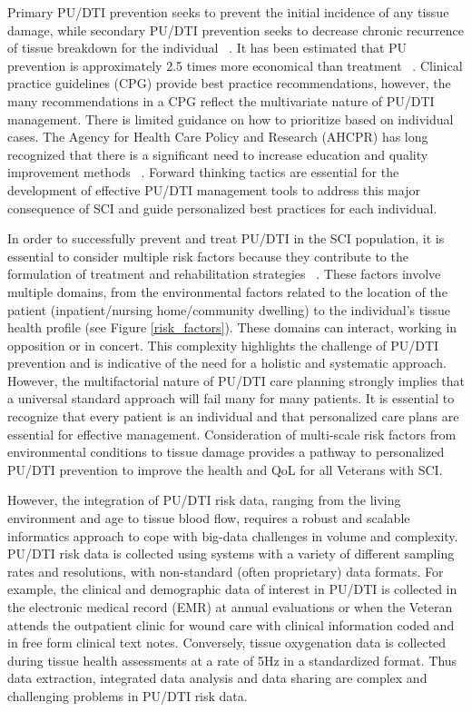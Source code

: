 \documentclass{amia}
\begin{document}
Primary PU/DTI prevention seeks to prevent the initial incidence of any tissue damage, while secondary PU/DTI prevention seeks to decrease chronic recurrence of tissue breakdown for the individual ~\cite{ref7}. It has been estimated that PU prevention is approximately 2.5 times more economical than treatment ~\cite{ref8}. Clinical practice guidelines (CPG) provide best practice recommendations, however, the many recommendations in a CPG reflect the multivariate nature of PU/DTI management. There is limited guidance on how to prioritize based on individual cases. The Agency for Health Care Policy and Research (AHCPR) has long recognized that there is a significant need to increase education and quality improvement methods ~\cite{ref9}. Forward thinking tactics are essential for the development of effective PU/DTI management tools to address this major consequence of SCI and guide personalized best practices for each individual.

In order to successfully prevent and treat PU/DTI in the SCI population, it is essential to consider multiple risk factors because they contribute to the formulation of treatment and rehabilitation strategies ~\cite{ref10}. These factors involve multiple domains, from the environmental factors related to the location of the patient (inpatient/nursing home/community dwelling) to the individual’s tissue health profile (see Figure \ref{risk_factors}). These domains can interact, working in opposition or in concert. This complexity highlights the challenge of PU/DTI prevention and is indicative of the need for a holistic and systematic approach. However, the multifactorial nature of PU/DTI care planning strongly implies that a universal standard approach will fail many for many patients. It is essential to recognize that every patient is an individual and that personalized care plans are essential for effective management. Consideration of multi-scale risk factors from environmental conditions to tissue damage provides a pathway to personalized PU/DTI prevention to improve the health and QoL for all Veterans with SCI.

However, the integration of PU/DTI risk data, ranging from the living environment and age to tissue blood flow, requires a robust and scalable informatics approach to cope with big-data challenges in volume and complexity. PU/DTI risk data is collected using systems with a variety of different sampling rates and resolutions, with non-standard (often proprietary) data formats. For example, the clinical and demographic data of interest in PU/DTI is collected in the electronic medical record (EMR) at annual evaluations or when the Veteran attends the outpatient clinic for wound care with clinical information coded and in free form clinical text notes. Conversely, tissue oxygenation data is collected during tissue health assessments at a rate of 5Hz in a standardized format. Thus data extraction, integrated data analysis and data sharing are complex and challenging problems in PU/DTI risk data.
\end{document}
